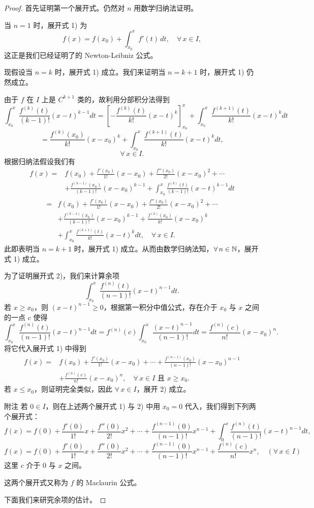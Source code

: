 \begin{proof}

首先证明第一个展开式。仍然对 $n$ 用数学归纳法证明。

当 $n=1$ 时，展开式 1) 为
\[f(x)=f(x_0)+\int_{x_0}^{x}f'(t)\,dt,\quad\forall\,x\in I,\]
这正是我们已经证明了的 Newton-Leibniz 公式。

现假设当 $n=k$ 时，展开式 1) 成立。我们来证明当 $n=k+1$ 时，展开式 1) 仍然成立。

由于 $f$ 在 $I$ 上是 $C^{k+1}$ 类的，故利用分部积分法得到
\[\int_{x_0}^{x}\frac{f^{(k)}(t)}{(k-1)!}(x-t)^{k-1}dt=\left[-\frac{f^{(k)}(t)}{k!}(x-t)^k\right]_{x_0}^{x}+\int_{x_0}^{x}\frac{f^{(k+1)}(t)}{k!}(x-t)^kdt\]
\[=\frac{f^{(k)}(x_0)}{k!}(x-x_0)^k+\int_{x_0}^{x}\frac{f^{(k+1)}(t)}{k!}(x-t)^kdt,\]
\[\forall\,x\in I.\]
根据归纳法假设我们有
\[\begin{aligned}
f(x)={}&f(x_0)+\frac{f'(x_0)}{1!}(x-x_0)+\frac{f''(x_0)}{2!}(x-x_0)^2+\cdots\\
&+\frac{f^{(k-1)}(x_0)}{(k-1)!}(x-x_0)^{k-1}+\int_{x_0}^{x}\frac{f^{(k)}(t)}{(k-1)!}(x-t)^{k-1}dt
\end{aligned}\]
\[\begin{aligned}
={}&f(x_0)+\frac{f'(x_0)}{1!}(x-x_0)+\frac{f''(x_0)}{2!}(x-x_0)^2+\cdots\\
&+\frac{f^{(k-1)}(x_0)}{(k-1)!}(x-x_0)^{k-1}+\frac{f^{(k)}(x_0)}{k!}(x-x_0)^k\\
&+\int_{x_0}^{x}\frac{f^{(k+1)}(t)}{k!}(x-t)^kdt,\quad\forall\,x\in I.
\end{aligned}\]
此即表明当 $n=k+1$ 时，展开式 1) 成立。从而由数学归纳法知，$\forall\,n\in\mathbb{N}$，展开式 1) 成立。

为了证明展开式 2)，我们来计算余项
\[\int_{x_0}^{x}\frac{f^{(n)}(t)}{(n-1)!}(x-t)^{n-1}dt.\]
若 $x\geqslant x_0$，则 $(x-t)^{n-1}\geqslant0$，根据第一积分中值公式，存在介于 $x_0$ 与 $x$ 之间的一点 $c$ 使得
\[\int_{x_0}^{x}\frac{f^{(n)}(t)}{(n-1)!}(x-t)^{n-1}dt=f^{(n)}(c)\int_{x_0}^{x}\frac{(x-t)^{n-1}}{(n-1)!}dt=\frac{f^{(n)}(c)}{n!}(x-x_0)^n.\]
将它代入展开式 1) 中得到
\[\begin{aligned}
f(x)={}&f(x_0)+\frac{f'(x_0)}{1!}(x-x_0)+\cdots+\frac{f^{(n-1)}(x_0)}{(n-1)!}(x-x_0)^{n-1}\\
&+\frac{f^{(n)}(c)}{n!}(x-x_0)^n,\quad\forall\,x\in I\text{ 且 }x\geqslant x_0.
\end{aligned}\]
若 $x\leqslant x_0$，则证明完全类似，因此 $\forall\,x\in I$，展开 2) 成立。

附注 若 $0\in I$，则在上述两个展开式 1) 与 2) 中用 $x_0=0$ 代入，我们得到下列两个展开式：
\[f(x)=f(0)+\frac{f'(0)}{1!}x+\frac{f''(0)}{2!}x^2+\cdots+\frac{f^{(n-1)}(0)}{(n-1)!}x^{n-1}+\int_{0}^{x}\frac{f^{(n)}(t)}{(n-1)!}(x-t)^{n-1}dt,\]
\[f(x)=f(0)+\frac{f'(0)}{1!}x+\frac{f''(0)}{2!}x^2+\cdots+\frac{f^{(n-1)}(0)}{(n-1)!}x^{n-1}+\frac{f^{(n)}(c)}{n!}x^n,\quad(\forall\,x\in I)\]
这里 $c$ 介于 $0$ 与 $x$ 之间。

这两个展开式又称为 $f$ 的 Maclaurin 公式。

下面我们来研究余项的估计。

\end{proof}

